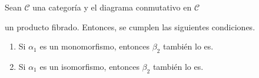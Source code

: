 \documentclass[tesis]{subfiles}
\begin{document}
\begin{Coro} \label{Mendoza-Ejer.8(a)}
    Sean $\mathscr{C}$ una categoría y el diagrama conmutativo en $\mathscr{C}$
    \begin{center}
    \end{center}
    un producto fibrado. Entonces, se cumplen las siguientes condiciones.

    \begin{enumerate}[label=(\alph*)]
    
        \item Si $\alpha_1$ es un monomorfismo, entonces $\beta_2$ también lo es.

        \item Si $\alpha_1$ es un isomorfismo, entonces $\beta_2$ también lo es.
    \end{enumerate}
\end{Coro}
\end{document}
